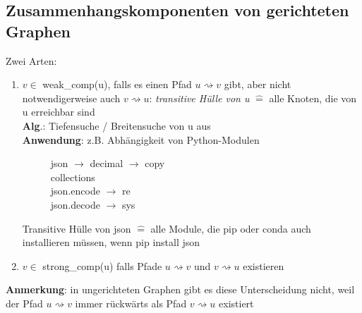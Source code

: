 \documentclass[11pt, fleqn]{scrreprt}
\begin{document}
    \subsection*{Zusammenhangskomponenten von gerichteten Graphen}

    Zwei Arten:
    \begin{enumerate}
        \item $v \in$ weak\_comp(u), falls es einen Pfad $u \rightsquigarrow v$ gibt, aber nicht notwendigerweise auch $v \rightsquigarrow u$: \emph{transitive Hülle von u} $\widehat{=}$ alle Knoten, die von u erreichbar sind\\
        \textbf{Alg}.: Tiefensuche / Breitensuche von u aus \\
        \textbf{Anwendung}: z.B. Abhängigkeit von Python-Modulen

        \begin{figure}[htbp]
            \hspace*{2cm}json $\rightarrow$ decimal $\rightarrow$ copy \\
            \hspace*{5cm}  collections\\
            \hspace*{3cm}  json.encode \raisebox{-1.5mm}{$\searrow$} \hspace*{-5mm}$\rightarrow$ re\\
            \hspace*{3cm}  json.decode \raisebox{2mm}{$\nearrow$} \hspace*{-6mm} $\rightarrow$ sys
        \end{figure}
        Transitive Hülle von json $\widehat{=}$ alle Module, die pip oder conda auch installieren müssen, wenn \glqq pip install json\grqq
        \item $v \in$ strong\_comp(u) falls Pfade $u \rightsquigarrow v$ und $v \rightsquigarrow u$ existieren
    \end{enumerate}
    \textbf{Anmerkung}: in ungerichteten Graphen gibt es diese Unterscheidung nicht, weil der Pfad $u \rightsquigarrow v$ immer rückwärts als Pfad $v \rightsquigarrow u$ existiert\\
\end{document}
